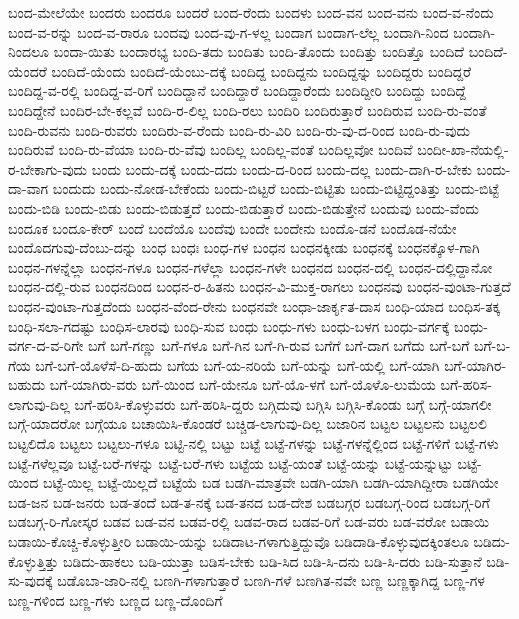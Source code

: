 {ಬಂದ-ಮೇಲೆಯೇ
ಬಂದರು
ಬಂದರೂ
ಬಂದರೆ
ಬಂದ-ರೆಂದು
ಬಂದಳು
ಬಂದ-ವನ
ಬಂದ-ವನು
ಬಂದ-ವ-ನೆಂದು
ಬಂದ-ವ-ರನ್ನು
ಬಂದ-ವ-ರಾರೂ
ಬಂದವು
ಬಂದ-ವು-ಗ-ಳಲ್ಲ
ಬಂದಾಗ
ಬಂದಾಗ-ಲೆಲ್ಲ
ಬಂದಾಗಿ-ನಿಂದ
ಬಂದಾಗಿ-ನಿಂದಲೂ
ಬಂದಾ-ಯಿತು
ಬಂದಾರಭ್ಯ
ಬಂದಿ-ತದು
ಬಂದಿತು
ಬಂದಿ-ತೊಂದು
ಬಂದಿತ್ತು
ಬಂದಿತ್ತೊ
ಬಂದಿದೆ
ಬಂದಿದೆ-ಯೆಂದರೆ
ಬಂದಿದೆ-ಯೆಂದು
ಬಂದಿದೆ-ಯೆಂಬು-ದಕ್ಕೆ
ಬಂದಿದ್ದ
ಬಂದಿದ್ದನು
ಬಂದಿದ್ದನ್ನು
ಬಂದಿದ್ದರು
ಬಂದಿದ್ದರೆ
ಬಂದಿದ್ದ-ವ-ರಲ್ಲಿ
ಬಂದಿದ್ದ-ವ-ರಿಗೆ
ಬಂದಿದ್ದಾನೆ
ಬಂದಿದ್ದಾರೆ
ಬಂದಿದ್ದಾರೆಂದು
ಬಂದಿದ್ದೀರಿ
ಬಂದಿದ್ದು
ಬಂದಿದ್ದೆ
ಬಂದಿದ್ದೇನೆ
ಬಂದಿರ-ಬೇ-ಕಲ್ಲವೆ
ಬಂದಿ-ರ-ಲಿಲ್ಲ
ಬಂದಿ-ರಲು
ಬಂದಿರಿ
ಬಂದಿರುತ್ತಾರೆ
ಬಂದಿರುವ
ಬಂದಿ-ರು-ವಂತೆ
ಬಂದಿ-ರುವನು
ಬಂದಿ-ರುವರು
ಬಂದಿರು-ವ-ರೆಂದು
ಬಂದಿ-ರು-ವಿರಿ
ಬಂದಿ-ರು-ವು-ದ-ರಿಂದ
ಬಂದಿ-ರು-ವುದು
ಬಂದಿರುವೆ
ಬಂದಿ-ರು-ವೆಯಾ
ಬಂದಿ-ರು-ವೆವು
ಬಂದಿಲ್ಲ
ಬಂದಿಲ್ಲ-ವಂತೆ
ಬಂದಿಲ್ಲವೋ
ಬಂದಿವೆ
ಬಂದೀ-ಖಾ-ನೆಯಲ್ಲಿ-ರ-ಬೇಕಾಗು-ವುದು
ಬಂದು
ಬಂದು-ದಕ್ಕೆ
ಬಂದು-ದದು
ಬಂದು-ದ-ರಿಂದ
ಬಂದು-ದಲ್ಲ
ಬಂದು-ದಾಗಿ-ರ-ಬೇಕು
ಬಂದು-ದಾ-ವಾಗ
ಬಂದುದು
ಬಂದು-ನೋಡ-ಬೇಕೆಂದು
ಬಂದು-ಬಿಟ್ಟರೆ
ಬಂದು-ಬಿಟ್ಟಿತು
ಬಂದು-ಬಿಟ್ಟಿದ್ದಂತಿತ್ತು
ಬಂದು-ಬಿಟ್ಟೆ
ಬಂದು-ಬಿಡಿ
ಬಂದು-ಬಿಡು
ಬಂದು-ಬಿಡುತ್ತದೆ
ಬಂದು-ಬಿಡುತ್ತಾರೆ
ಬಂದು-ಬಿಡುತ್ತೇನೆ
ಬಂದುವು
ಬಂದು-ವೆಂದು
ಬಂದೂಕ
ಬಂದೂ-ಕೇರ್
ಬಂದೆ
ಬಂದೆಯೊ
ಬಂದೆವು
ಬಂದೇ
ಬಂದೇನು
ಬಂದೊ-ಡನೆ
ಬಂದೊಡ-ನೆಯೇ
ಬಂದೊದಗುವು-ದೆಂಬು-ದನ್ನು
ಬಂಧ
ಬಂಧಃ
ಬಂಧ-ಗಳ
ಬಂಧನ
ಬಂಧನಕ್ಕೀಡು
ಬಂಧನಕ್ಕೆ
ಬಂಧನಕ್ಕೊಳ-ಗಾಗಿ
ಬಂಧನ-ಗಳನ್ನೆಲ್ಲಾ
ಬಂಧನ-ಗಳೂ
ಬಂಧನ-ಗಳೆಲ್ಲಾ
ಬಂಧನ-ಗಳೇ
ಬಂಧನದ
ಬಂಧನ-ದಲ್ಲಿ
ಬಂಧನ-ದಲ್ಲಿದ್ದಾನೋ
ಬಂಧನ-ದಲ್ಲಿ-ರುವ
ಬಂಧನದಿಂದ
ಬಂಧನ-ರ-ಹಿತನು
ಬಂಧನ-ವಿ-ಮುಕ್ತ-ರಾಗಲು
ಬಂಧನವು
ಬಂಧನ-ವುಂಟಾ-ಗುತ್ತದೆ
ಬಂಧನ-ವುಂಟಾ-ಗುತ್ತದೆಂದು
ಬಂಧನ-ವೆಂದ-ರೇನು
ಬಂಧನವೇ
ಬಂಧಾ-ಜಾರ್ಕೃತ-ದಾಸ
ಬಂಧಿ-ಯಾದ
ಬಂಧಿಸ-ತಕ್ಕ
ಬಂಧಿ-ಸಲಾ-ಗದಷ್ಟು
ಬಂಧಿಸ-ಲಾರವು
ಬಂಧಿ-ಸುವ
ಬಂಧು
ಬಂಧು-ಗಳು
ಬಂಧು-ಬಳಗ
ಬಂಧು-ವರ್ಗಕ್ಕೆ
ಬಂಧು-ವರ್ಗ-ದ-ವ-ರಿಗೇ
ಬಗೆ
ಬಗೆ-ಗಣ್ಣು
ಬಗೆ-ಗಳೂ
ಬಗೆ-ಗಿನ
ಬಗೆ-ಗಿ-ರುವ
ಬಗೆಗೆ
ಬಗೆ-ದಾಗ
ಬಗೆದು
ಬಗೆ-ಬಗೆ
ಬಗೆ-ಬ-ಗೆಯ
ಬಗೆ-ಬಗೆ-ಯೊಳೆಸೆ-ದಿ-ಹುದು
ಬಗೆಯ
ಬಗೆ-ಯ-ನರಿಯೆ
ಬಗೆ-ಯನ್ನು
ಬಗೆ-ಯಲ್ಲಿ
ಬಗೆ-ಯಾಗಿ
ಬಗೆ-ಯಾಗಿರ-ಬಹುದು
ಬಗೆ-ಯಾಗಿರು-ವರು
ಬಗೆ-ಯಿಂದ
ಬಗೆ-ಯೇನೂ
ಬಗೆ-ಯೊ-ಳಗೆ
ಬಗೆ-ಯೊಳೊ-ಲುಮೆಯ
ಬಗೆ-ಹರಿಸ-ಲಾಗುವು-ದಿಲ್ಲ
ಬಗೆ-ಹರಿಸಿ-ಕೊಳ್ಳುವರು
ಬಗೆ-ಹರಿಸಿ-ದ್ದರು
ಬಗ್ಗಿದುವು
ಬಗ್ಗಿಸಿ
ಬಗ್ಗಿಸಿ-ಕೊಂಡು
ಬಗ್ಗೆ
ಬಗ್ಗೆ-ಯಾಗಲೀ
ಬಗ್ಗೆ-ಯಾದರೋ
ಬಗ್ಗೆಯೂ
ಬಚಾಯಿಸಿ-ಕೊಂಡರೆ
ಬಚ್ಚಿಡ-ಲಾಗುವು-ದಿಲ್ಲ
ಬಜಾರಿನ
ಬಟ್ಟಲ
ಬಟ್ಟಲನು
ಬಟ್ಟಲಲಿ
ಬಟ್ಟಲಿದೊ
ಬಟ್ಟಲು
ಬಟ್ಟಲು-ಗಳೂ
ಬಟ್ಟಿ-ನಲ್ಲಿ
ಬಟ್ಟು
ಬಟ್ಟೆ
ಬಟ್ಟೆ-ಗಳನ್ನು
ಬಟ್ಟೆ-ಗಳನ್ನೆಲ್ಲಿಂದ
ಬಟ್ಟೆ-ಗಳಿಗೆ
ಬಟ್ಟೆ-ಗಳು
ಬಟ್ಟೆ-ಗಳೆಲ್ಲವೂ
ಬಟ್ಟೆ-ಬರೆ-ಗಳನ್ನು
ಬಟ್ಟೆ-ಬರೆ-ಗಳು
ಬಟ್ಟೆಯ
ಬಟ್ಟೆ-ಯಂತೆ
ಬಟ್ಟೆ-ಯನ್ನು
ಬಟ್ಟೆ-ಯನ್ನುಟ್ಟು
ಬಟ್ಟೆ-ಯಿಂದ
ಬಟ್ಟೆ-ಯಿಲ್ಲ
ಬಟ್ಟೆ-ಯಿಲ್ಲದೆ
ಬಟ್ಟೆಯೆ
ಬಡ
ಬಡಗಿ-ಮಾತ್ರವೇ
ಬಡಗಿ-ಯಾಗಿ
ಬಡಗಿ-ಯಾಗಿದ್ದೀರಾ
ಬಡಗಿಯೇ
ಬಡ-ಜನ
ಬಡ-ಜನರು
ಬಡ-ತಂದೆ
ಬಡ-ತ-ನಕ್ಕೆ
ಬಡ-ತನದ
ಬಡ-ದೇಶ
ಬಡಬಗ್ಗರ
ಬಡಬಗ್ಗ-ರಿಂದ
ಬಡಬಗ್ಗ-ರಿಗೆ
ಬಡಬಗ್ಗ-ರಿ-ಗೋಸ್ಕರ
ಬಡವ
ಬಡ-ವನ
ಬಡವ-ರಲ್ಲಿ
ಬಡವ-ರಾದ
ಬಡವ-ರಿಗೆ
ಬಡ-ವರು
ಬಡ-ವರೋ
ಬಡಾಯಿ
ಬಡಾಯಿ-ಕೊಚ್ಚಿ-ಕೊಳ್ಳುತ್ತೀರಿ
ಬಡಾಯಿ-ಯನ್ನು
ಬಡಿದಾಟ-ಗಳಾಗುತ್ತಿದ್ದುವೊ
ಬಡಿದಾಡಿ-ಕೊಳ್ಳುವುದಕ್ಕಿಂತಲೂ
ಬಡಿದು-ಕೊಳ್ಳುತ್ತಿತ್ತು
ಬಡಿದು-ಹಾಕಲು
ಬಡಿ-ಯುತ್ತಾ
ಬಡಿಸ-ಬೇಕು
ಬಡಿ-ಸಿದ
ಬಡಿ-ಸಿ-ದನು
ಬಡಿ-ಸಿ-ದರು
ಬಡಿ-ಸುತ್ತಾನೆ
ಬಡಿ-ಸು-ವುದಕ್ಕೆ
ಬಡೊಬಾ-ಜಾರಿ-ನಲ್ಲಿ
ಬಣಗಿ-ಗಳಾಗುತ್ತಾರೆ
ಬಣಗಿ-ಗಳೆ
ಬಣಗಿತ-ನವೇ
ಬಣ್ಣ
ಬಣ್ಣಕ್ಕಾಗಿದ್ದ
ಬಣ್ಣ-ಗಳ
ಬಣ್ಣ-ಗಳಿಂದ
ಬಣ್ಣ-ಗಳು
ಬಣ್ಣದ
ಬಣ್ಣ-ದೊಂದಿಗೆ
}
